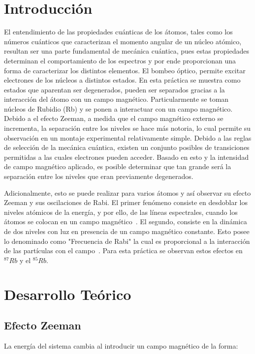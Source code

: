 \documentclass[%
 reprint,
 amsmath,amssymb,
 aps,
]{revtex4-1}
\begin{document}
\section{Introducción}
 El entendimiento de las propiedades cuánticas de los átomos, tales como los números cuánticos que caracterizan el momento angular de un núcleo atómico, resultan ser una parte fundamental de mecánica cuántica, pues estas propiedades determinan el comportamiento de los espectros y por ende proporcionan una forma de caracterizar los distintos elementos. El bombeo óptico, permite excitar electrones de los núcleos a distintos estados. En esta práctica se muestra como estados que aparentan ser degenerados, pueden ser separados gracias a la interacción del átomo con un campo magnético. Particularmente se toman núcleos de Rubidio (Rb) y se ponen a interactuar con un campo magnético. Debido a el efecto Zeeman, a medida que el campo magnético externo se incrementa, la separación entre los niveles se hace más notoria, lo cual permite su observación en un montaje experimental relativamente simple.
 Debido a las reglas de selección de la mecánica cuántica, existen un conjunto posibles de transiciones permitidas a las cuales electrones pueden acceder. Basado en esto y la intensidad de campo magnético aplicado, es posible determinar que tan grande será la separación entre los niveles que eran previamente degenerados.
 
 Adicionalmente, esto se puede realizar para varios átomos y así observar su efecto Zeeman y sus oscilaciones de Rabi. El primer fenómeno consiste en desdoblar los niveles atómicos de la energía, y por ello, de las líneas espectrales, cuando los átomos se colocan en un campo magnético~\cite{Zeeman}. El segundo, consiste en la dinámica de dos niveles con luz en presencia de un campo magnético constante. Esto posee lo denominado como "Frecuencia de Rabi" la cual es proporcional a la interacción de las partículas con el campo~\cite{teoria de rabi}. Para esta práctica se observan estos efectos en $^{87}Rb$ y el $^{85}Rb$.
 
 \section{Desarrollo Teórico}
 
 \subsection{Efecto Zeeman}
 
La energía del sistema cambia al introducir un campo magnético de la forma:
\end{document}
